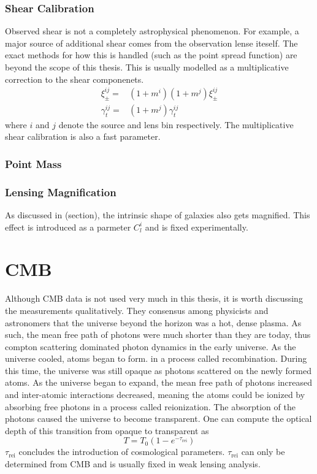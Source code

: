 \subsubsection{Shear Calibration}
Observed shear is not a completely astrophysical phenomenon. For example, a major source of additional shear comes from the observation lense iteself. The exact methods for how this is handled (such as the point spread function) are beyond the scope of this thesis. This is usually modelled as a multiplicative correction to the shear componenets.
\begin{equation}
	\begin{split}
		\xi^{ij}_{\pm} =& (1+m^i)(1+m^j) \xi^{ij}_{\pm} \\
		\gamma^{ij}_t =& (1+m^j) \gamma_t^{ij}
	\end{split}
\end{equation}
where $i$ and $j$ denote the source and lens bin respectively. The multiplicative shear calibration is also a fast parameter.
\subsubsection{Point Mass}
\subsubsection{Lensing Magnification}
As discussed in (section), the intrinsic shape of galaxies also gets magnified. This effect is introduced as a parmeter $C_l^i$ and is fixed experimentally.


\section{CMB}
Although CMB data is not used very much in this thesis, it is worth discussing the measurements qualitatively. They consensus among physicists and astronomers that the universe beyond the horizon was a hot, dense plasma. As such, the mean free path of photons were much shorter than they are today, thus compton scattering dominated photon dynamics in the early universe. As the universe cooled, atoms began to form. in a process called recombination. During this time, the universe was still opaque as photons scattered on the newly formed atoms. As the universe began to expand, the mean free path of photons increased and inter-atomic interactions decreased, meaning the atoms could be ionized by absorbing free photons in a process called reionization. The absorption of the photons caused the universe to become transparent. One can compute the optical depth of this transition from opaque to transparent as
\begin{equation}
	T = T_0(1-e^{-\tau_{\mathrm{rei}}})
\end{equation}
$\tau_{\mathrm{rei}}$ concludes the introduction of cosmological parameters. $\tau_{\mathrm{rei}}$ can only be determined from CMB and is usually fixed in weak lensing analysis.

